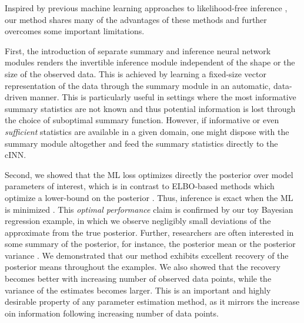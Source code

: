 \documentclass[9pt,twoside,lineno]{pnas-new}
\begin{document}
Inspired by previous machine learning approaches to likelihood-free inference \cite{radev2019towards, hwang2018conditional, mestdagh2018prepaid, raynal2018abc, jiang2017learning, lueckmann2017flexible, papamakarios2016fast}, our method shares many of the advantages of these methods and further overcomes some important limitations. 

First, the introduction of separate summary and inference neural network modules renders the invertible inference module independent of the shape or the size of the observed data. This is achieved by learning a fixed-size vector representation of the data through the summary module in an automatic, data-driven manner. This is particularly useful in settings where the most informative summary statistics are not known and thus potential information is lost through the choice of suboptimal summary function. However, if informative or even \textit{sufficient} statistics are available in a given domain, one might dispose with the summary module altogether and feed the summary statistics directly to the cINN. 

Second, we showed that the ML loss optimizes directly the posterior over model parameters of interest, which is in contrast to ELBO-based methods which optimize a lower-bound on the posterior \cite{papamakarios2016fast, kingma2014auto}. Thus, inference is exact when the ML is minimized \cite{kingma2018glow, dinh2016density}. This \textit{optimal performance} claim is confirmed by our toy Bayesian regression example, in which we observe negligibly small deviations of the approximate from the true posterior. Further, researchers are often interested in some summary of the posterior, for instance, the posterior mean or the posterior variance \cite{radev2019towards, raynal2018abc}. We demonstrated that our method exhibits excellent recovery of the posterior means throughout the examples. We also showed that the recovery becomes better with increasing number of observed data points, while the variance of the estimates becomes larger. This is an important and highly desirable property of any parameter estimation method, as it mirrors the increase oin information following increasing number of data points. 
\end{document}
